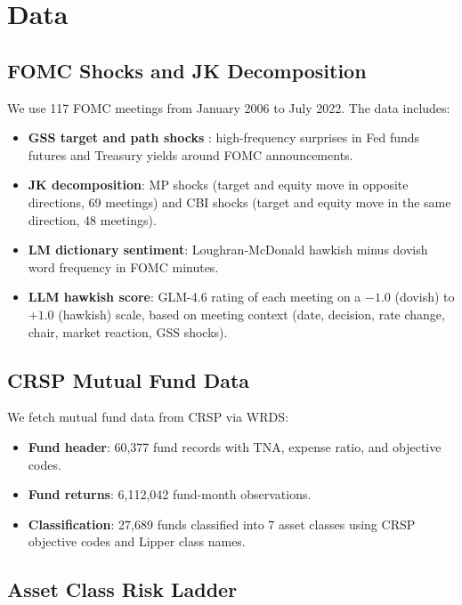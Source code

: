 \documentclass[11pt,a4paper]{article}
\begin{document}
\section{Data}
\label{sec:data}

\subsection{FOMC Shocks and JK Decomposition}

We use 117 FOMC meetings from January 2006 to July 2022. The data includes:

\begin{itemize}[noitemsep]
    \item \textbf{GSS target and path shocks} \citep{gurkaynak2005actions}: high-frequency surprises in Fed funds futures and Treasury yields around FOMC announcements.
    \item \textbf{JK decomposition}: MP shocks (target and equity move in opposite directions, 69 meetings) and CBI shocks (target and equity move in the same direction, 48 meetings).
    \item \textbf{LM dictionary sentiment}: Loughran-McDonald hawkish minus dovish word frequency in FOMC minutes.
    \item \textbf{LLM hawkish score}: GLM-4.6 rating of each meeting on a $-1.0$ (dovish) to $+1.0$ (hawkish) scale, based on meeting context (date, decision, rate change, chair, market reaction, GSS shocks).
\end{itemize}

\subsection{CRSP Mutual Fund Data}

We fetch mutual fund data from CRSP via WRDS:

\begin{itemize}[noitemsep]
    \item \textbf{Fund header}: 60,377 fund records with TNA, expense ratio, and objective codes.
    \item \textbf{Fund returns}: 6,112,042 fund-month observations.
    \item \textbf{Classification}: 27,689 funds classified into 7 asset classes using CRSP objective codes and Lipper class names.
\end{itemize}

\subsection{Asset Class Risk Ladder}
\end{document}
